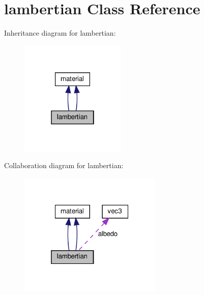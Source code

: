 \hypertarget{classlambertian}{}\section{lambertian Class Reference}
\label{classlambertian}


Inheritance diagram for lambertian\+:
\nopagebreak
\begin{figure}[H]
\begin{center}
\leavevmode
\includegraphics[width=142pt]{classlambertian__inherit__graph}
\end{center}
\end{figure}


Collaboration diagram for lambertian\+:
\nopagebreak
\begin{figure}[H]
\begin{center}
\leavevmode
\includegraphics[width=193pt]{classlambertian__coll__graph}
\end{center}
\end{figure}
